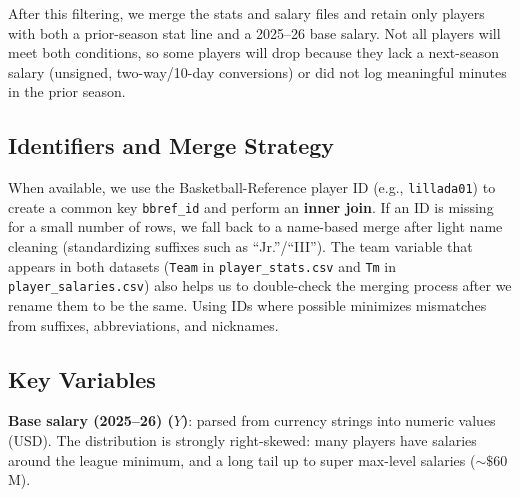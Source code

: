 \documentclass{article}
\theoremstyle{plain}
\theoremstyle{definition}
\theoremstyle{remark}
\begin{document}
After this filtering, we merge the stats and salary files and retain only players with both a prior-season stat line and a 2025--26 base salary. Not all players will meet both conditions, so some players will drop because they lack a next-season salary (unsigned, two-way/10-day conversions) or did not log meaningful minutes in the prior season.

\subsection*{Identifiers and Merge Strategy}
When available, we use the Basketball-Reference player ID (e.g., \texttt{lillada01}) to create a common key \texttt{bbref\_id} and perform an \textbf{inner join}. If an ID is missing for a small number of rows, we fall back to a name-based merge after light name cleaning (standardizing suffixes such as ``Jr.''/``III'').  The team variable that appears in both datasets (\texttt{Team} in \texttt{player\_stats.csv} and \texttt{Tm} in \texttt{player\_salaries.csv}) also helps us to double-check the merging process after we rename them to be the same. 
Using IDs where possible minimizes mismatches from suffixes, abbreviations, and nicknames.

\subsection*{Key Variables}
\textbf{Base salary (2025--26) ($Y$)}: parsed from currency strings into numeric values (USD). The distribution is strongly right-skewed: many players have salaries around the league minimum, and a long tail up to super max-level salaries ($\sim\$60$M).
\end{document}
